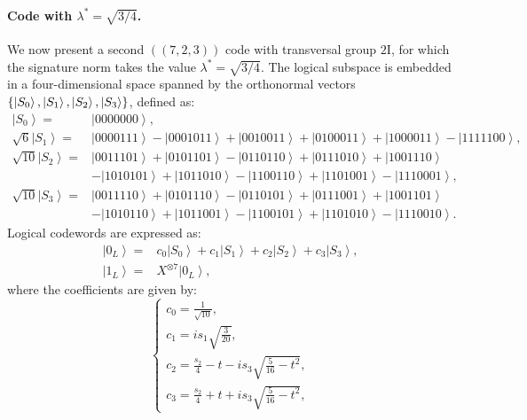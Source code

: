 \documentclass[8pt]{article}
\theoremstyle{definition}
\begin{document}
\paragraph{Code with \texorpdfstring{$\lambda^* = \sqrt{3/4}$}{λ* = √(3/4)}.}We now present a second \(((7,2,3))\) code with transversal group \(2\mathrm{I}\), for which the signature norm takes the value \(\lambda^* = \sqrt{3/4}\). The logical subspace is embedded in a four-dimensional space spanned by the orthonormal vectors \(\{\ket{S_0}, \ket{S_1}, \ket{S_2}, \ket{S_3}\}\), defined as:
\begin{align*}
    \left|S_{0}\right\rangle =          & \left|0000000\right\rangle ,                                                                                                                                            \\
    \sqrt{6}\left|S_{1}\right\rangle =  & \left|0000111\right\rangle -\left|0001011\right\rangle +\left|0010011\right\rangle +\left|0100011\right\rangle +\left|1000011\right\rangle -\left|1111100\right\rangle, \\
    \sqrt{10}\left|S_{2}\right\rangle = & \left|0011101\right\rangle +\left|0101101\right\rangle -\left|0110110\right\rangle +\left|0111010\right\rangle +\left|1001110\right\rangle                              \\&-\left|1010101\right\rangle +\left|1011010\right\rangle -\left|1100110\right\rangle +\left|1101001\right\rangle -\left|1110001\right\rangle, \\
    \sqrt{10}\left|S_{3}\right\rangle = & \left|0011110\right\rangle +\left|0101110\right\rangle -\left|0110101\right\rangle +\left|0111001\right\rangle +\left|1001101\right\rangle                              \\&-\left|1010110\right\rangle +\left|1011001\right\rangle -\left|1100101\right\rangle +\left|1101010\right\rangle -\left|1110010\right\rangle.
\end{align*}
Logical codewords are expressed as:
\begin{align*}
    \left|0_{L}\right\rangle = & c_{0}\left|S_{0}\right\rangle +c_{1}\left|S_{1}\right\rangle +c_{2}\left|S_{2}\right\rangle +c_{3}\left|S_{3}\right\rangle, \\
    \left|1_{L}\right\rangle = & X^{\otimes7}\left|0_{L}\right\rangle,
\end{align*}
where the coefficients are given by:
\[ \begin{cases}
        c_{0}=\frac{1}{\sqrt{10}},                               \\
        c_{1}=is_{1}\sqrt{\frac{3}{20}},                         \\
        c_{2}=\frac{s_{2}}{4}-t-is_{3}\sqrt{\frac{5}{16}-t^{2}}, \\
        c_{3}=\frac{s_{2}}{4}+t+is_{3}\sqrt{\frac{5}{16}-t^{2}},
    \end{cases} \]
\end{document}
